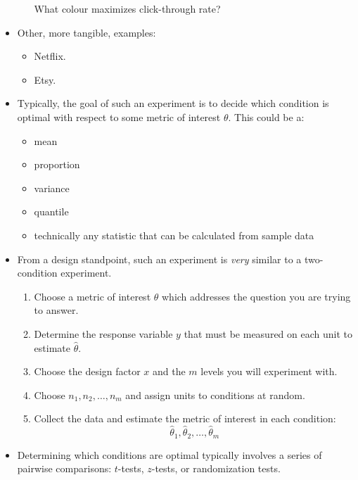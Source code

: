 \begin{itemize}
\begin{itemize}
                        What colour maximizes click-through rate?
            \end{itemize}
      \item Other, more tangible, examples:
            \begin{itemize}
                  \item Netflix.
                  \item Etsy.
            \end{itemize}
      \item Typically, the goal of such an experiment is to decide which condition is
            optimal with respect to some metric of interest $ \theta $. This could be a:
            \begin{itemize}
                  \item mean
                  \item proportion
                  \item variance
                  \item quantile
                  \item technically any statistic that can be calculated from sample data
            \end{itemize}
      \item From a design standpoint, such an experiment is \emph{very} similar to
            a two-condition experiment.
            \begin{enumerate}
                  \item Choose a metric of interest $ \theta $ which addresses the question
                        you are trying to answer.
                  \item Determine the response variable $ y $ that must be measured on each
                        unit to estimate $ \hat{\theta} $.
                  \item Choose the design factor $ x $ and the $ m $ levels you will experiment with.
                  \item Choose $ n_1,n_2,\ldots,n_m $ and assign units to conditions at random.
                  \item Collect the data and estimate the metric of interest in each condition:
                        \[ \hat{\theta}_1,\hat{\theta}_2,\ldots,\hat{\theta}_m \]
            \end{enumerate}
      \item Determining which conditions are optimal typically involves a series of pairwise
            comparisons: $ t $-tests, $ z $-tests, or randomization tests.

\end{itemize}
